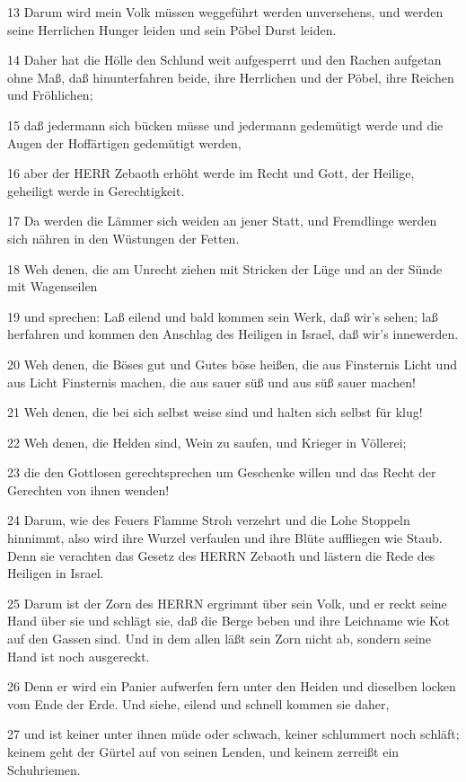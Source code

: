 \par 13 Darum wird mein Volk müssen weggeführt werden unversehens, und werden seine Herrlichen Hunger leiden und sein Pöbel Durst leiden.
\par 14 Daher hat die Hölle den Schlund weit aufgesperrt und den Rachen aufgetan ohne Maß, daß hinunterfahren beide, ihre Herrlichen und der Pöbel, ihre Reichen und Fröhlichen;
\par 15 daß jedermann sich bücken müsse und jedermann gedemütigt werde und die Augen der Hoffärtigen gedemütigt werden,
\par 16 aber der HERR Zebaoth erhöht werde im Recht und Gott, der Heilige, geheiligt werde in Gerechtigkeit.
\par 17 Da werden die Lämmer sich weiden an jener Statt, und Fremdlinge werden sich nähren in den Wüstungen der Fetten.
\par 18 Weh denen, die am Unrecht ziehen mit Stricken der Lüge und an der Sünde mit Wagenseilen
\par 19 und sprechen: Laß eilend und bald kommen sein Werk, daß wir's sehen; laß herfahren und kommen den Anschlag des Heiligen in Israel, daß wir's innewerden.
\par 20 Weh denen, die Böses gut und Gutes böse heißen, die aus Finsternis Licht und aus Licht Finsternis machen, die aus sauer süß und aus süß sauer machen!
\par 21 Weh denen, die bei sich selbst weise sind und halten sich selbst für klug!
\par 22 Weh denen, die Helden sind, Wein zu saufen, und Krieger in Völlerei;
\par 23 die den Gottlosen gerechtsprechen um Geschenke willen und das Recht der Gerechten von ihnen wenden!
\par 24 Darum, wie des Feuers Flamme Stroh verzehrt und die Lohe Stoppeln hinnimmt, also wird ihre Wurzel verfaulen und ihre Blüte auffliegen wie Staub. Denn sie verachten das Gesetz des HERRN Zebaoth und lästern die Rede des Heiligen in Israel.
\par 25 Darum ist der Zorn des HERRN ergrimmt über sein Volk, und er reckt seine Hand über sie und schlägt sie, daß die Berge beben und ihre Leichname wie Kot auf den Gassen sind. Und in dem allen läßt sein Zorn nicht ab, sondern seine Hand ist noch ausgereckt.
\par 26 Denn er wird ein Panier aufwerfen fern unter den Heiden und dieselben locken vom Ende der Erde. Und siehe, eilend und schnell kommen sie daher,
\par 27 und ist keiner unter ihnen müde oder schwach, keiner schlummert noch schläft; keinem geht der Gürtel auf von seinen Lenden, und keinem zerreißt ein Schuhriemen.
